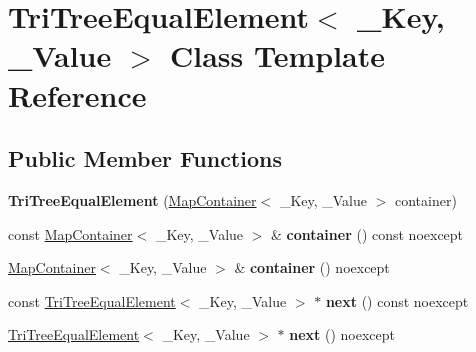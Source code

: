 \hypertarget{class_tri_tree_equal_element}{}\section{Tri\+Tree\+Equal\+Element$<$ \+\_\+\+Key, \+\_\+\+Value $>$ Class Template Reference}
\label{class_tri_tree_equal_element}
\subsection*{Public Member Functions}
\begin{DoxyCompactItemize}
\item 
\mbox{\label{class_tri_tree_equal_element_a308f1000901d9673326a59ca392651e5}} 
{\bfseries Tri\+Tree\+Equal\+Element} (\mbox{\hyperlink{struct_map_container}{Map\+Container}}$<$ \+\_\+\+Key, \+\_\+\+Value $>$ container)
\item 
\mbox{\label{class_tri_tree_equal_element_ac614c95a03cfbddda7413560565a0f51}} 
const \mbox{\hyperlink{struct_map_container}{Map\+Container}}$<$ \+\_\+\+Key, \+\_\+\+Value $>$ \& {\bfseries container} () const noexcept
\item 
\mbox{\label{class_tri_tree_equal_element_a825cb08aa4d2c9ab8d63f2e98c6898ab}} 
\mbox{\hyperlink{struct_map_container}{Map\+Container}}$<$ \+\_\+\+Key, \+\_\+\+Value $>$ \& {\bfseries container} () noexcept
\item 
\mbox{\label{class_tri_tree_equal_element_a1e03777e397f1f1aef2548659aededf0}} 
const \mbox{\hyperlink{class_tri_tree_equal_element}{Tri\+Tree\+Equal\+Element}}$<$ \+\_\+\+Key, \+\_\+\+Value $>$ $\ast$ {\bfseries next} () const noexcept
\item 
\mbox{\label{class_tri_tree_equal_element_a619ede00db805d939fee3a6d3fd1b724}} 
\mbox{\hyperlink{class_tri_tree_equal_element}{Tri\+Tree\+Equal\+Element}}$<$ \+\_\+\+Key, \+\_\+\+Value $>$ $\ast$ {\bfseries next} () noexcept
\item 
\mbox{\label{class_tri_tree_equal_element_a84c780393e1250b1350f9732a5490687}} 

\end{DoxyCompactItemize}
